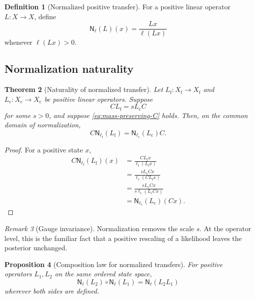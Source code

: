 \documentclass[11pt]{article}
\newtheorem{theorem}{Theorem}[section]
\newtheorem{proposition}[theorem]{Proposition}
\theoremstyle{definition}
\newtheorem{definition}[theorem]{Definition}
\theoremstyle{remark}
\newtheorem{remark}[theorem]{Remark}
\newcommand{\fine}{\mathrm f}
\newcommand{\coarse}{\mathrm c}
\newcommand{\Nrm}{\mathsf N}
\begin{document}
\begin{definition}[Normalized positive transfer]\label{def:normalized-transfer}
For a positive linear operator $L:X\to X$, define
\begin{equation}\label{eq:normalized-transfer}
  \Nrm_{\ell}(L)(x)
  =
  \frac{Lx}{\ell(Lx)}
\end{equation}
whenever $\ell(Lx)>0$.
\end{definition}

\subsection{Normalization naturality}

\begin{theorem}[Naturality of normalized transfer]\label{thm:normalized-transfer-naturality}
Let $L_{\fine}:X_{\fine}\to X_{\fine}$ and $L_{\coarse}:X_{\coarse}\to X_{\coarse}$ be positive linear operators.  Suppose
\begin{equation}\label{eq:positive-intertwining}
  CL_{\fine}=sL_{\coarse}C
\end{equation}
for some $s>0$, and suppose \eqref{eq:mass-preserving-C} holds.  Then, on the common domain of normalization,
\begin{equation}\label{eq:normalized-transfer-naturality}
  \boxed{
  C\Nrm_{\ell_{\fine}}(L_{\fine})
  =
  \Nrm_{\ell_{\coarse}}(L_{\coarse})C.}
\end{equation}
\end{theorem}

\begin{proof}
For a positive state $x$,
\begin{align*}
C\Nrm_{\ell_{\fine}}(L_{\fine})(x)
&=
\frac{CL_{\fine}x}{\ell_{\fine}(L_{\fine}x)}\\
&=
\frac{sL_{\coarse}Cx}{\ell_{\coarse}(CL_{\fine}x)}\\
&=
\frac{sL_{\coarse}Cx}{s\ell_{\coarse}(L_{\coarse}Cx)}\\
&=
\Nrm_{\ell_{\coarse}}(L_{\coarse})(Cx).
\end{align*}
\end{proof}

\begin{remark}[Gauge invariance]
Normalization removes the scale $s$.  At the operator level, this is the familiar fact that a positive rescaling of a likelihood leaves the posterior unchanged.
\end{remark}

\begin{proposition}[Composition law for normalized transfers]\label{prop:normalized-composition}
For positive operators $L_1,L_2$ on the same ordered state space,
\begin{equation}\label{eq:normalized-composition}
  \Nrm_{\ell}(L_2)
  \circ
  \Nrm_{\ell}(L_1)
  =
  \Nrm_{\ell}(L_2L_1)
\end{equation}
wherever both sides are defined.
\end{proposition}
\end{document}

